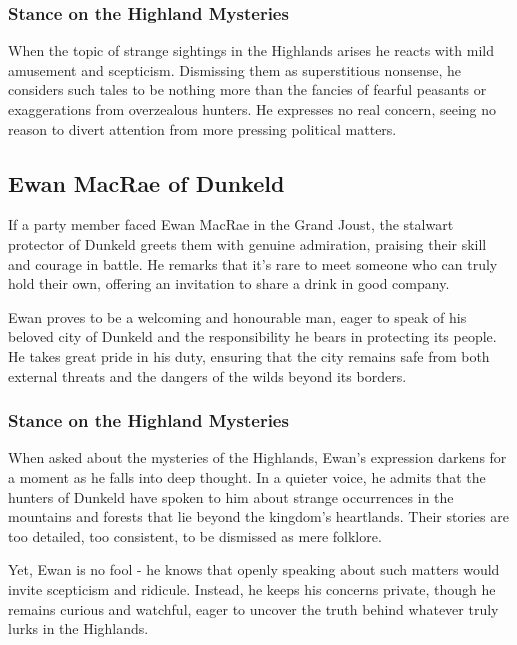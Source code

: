 \subsubsection*{Stance on the Highland Mysteries}
{\entryfont When the topic of strange sightings in the Highlands arises he reacts with mild amusement and scepticism. Dismissing them as superstitious nonsense, he considers such tales to be nothing more than the fancies of fearful peasants or exaggerations from overzealous hunters. He expresses no real concern, seeing no reason to divert attention from more pressing political matters.}
\subsection*{Ewan MacRae of Dunkeld}
{\entryfont If a party member faced Ewan MacRae in the Grand Joust, the stalwart protector of Dunkeld greets them with genuine admiration, praising their skill and courage in battle. He remarks that it's rare to meet someone who can truly hold their own, offering an invitation to share a drink in good company.

Ewan proves to be a welcoming and honourable man, eager to speak of his beloved city of Dunkeld and the responsibility he bears in protecting its people. He takes great pride in his duty, ensuring that the city remains safe from both external threats and the dangers of the wilds beyond its borders.}
\subsubsection*{Stance on the Highland Mysteries}
{\entryfont When asked about the mysteries of the Highlands, Ewan's expression darkens for a moment as he falls into deep thought. In a quieter voice, he admits that the hunters of Dunkeld have spoken to him about strange occurrences in the mountains and forests that lie beyond the kingdom's heartlands. Their stories are too detailed, too consistent, to be dismissed as mere folklore.

Yet, Ewan is no fool - he knows that openly speaking about such matters would invite scepticism and ridicule. Instead, he keeps his concerns private, though he remains curious and watchful, eager to uncover the truth behind whatever truly lurks in the Highlands.}
